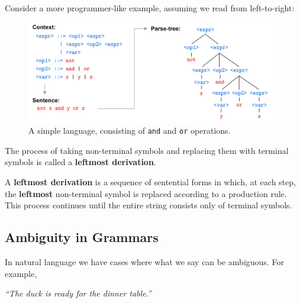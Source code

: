     \vspace{-.5em}
    \noindent
        Consider a more programmer-like example, assuming we read from left-to-right:

        \begin{figure}[h]
            \centering
            \includegraphics[width=1\textwidth]{Sections/Formal/bnf2.png}
            \caption{A simple language, consisting of \texttt{and} and \texttt{or} operations.}
            \label{fig:bnf2}
        \end{figure}

\newpage

\noindent
The process of taking non-terminal symbols and replacing them with terminal symbols is called a \textbf{leftmost derivation}.
\begin{Def}

    A \textbf{leftmost derivation} is a sequence of sentential forms in which, at each step, the \textbf{leftmost} non-terminal symbol is replaced according to a production rule. This process continues until the entire string consists only of terminal symbols.
    
\end{Def}
    
\subsection{Ambiguity in Grammars}

In natural language we have cases where what we say can be ambiguous. For example,
\begin{center}
    \textit
    {``The duck is ready for the dinner table.''}
\end{center}

